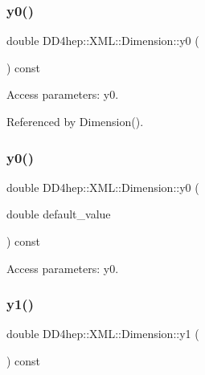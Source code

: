 \subsubsection{\texorpdfstring{y0()}{y0()}\hspace{0.1cm}{\footnotesize\ttfamily [1/2]}}
{\footnotesize\ttfamily double D\+D4hep\+::\+X\+M\+L\+::\+Dimension\+::y0 (\begin{DoxyParamCaption}{ }\end{DoxyParamCaption}) const}



Access parameters\+: y0. 



Referenced by Dimension().

\hypertarget{struct_d_d4hep_1_1_x_m_l_1_1_dimension_af356f83ce219b272fbad1d349d65f0ea}{}\label{struct_d_d4hep_1_1_x_m_l_1_1_dimension_af356f83ce219b272fbad1d349d65f0ea} 
\subsubsection{\texorpdfstring{y0()}{y0()}\hspace{0.1cm}{\footnotesize\ttfamily [2/2]}}
{\footnotesize\ttfamily double D\+D4hep\+::\+X\+M\+L\+::\+Dimension\+::y0 (\begin{DoxyParamCaption}\item[{double}]{default\+\_\+value }\end{DoxyParamCaption}) const}



Access parameters\+: y0. 

\hypertarget{struct_d_d4hep_1_1_x_m_l_1_1_dimension_a59a29570af0574b18541f49f2819f465}{}\label{struct_d_d4hep_1_1_x_m_l_1_1_dimension_a59a29570af0574b18541f49f2819f465} 
\subsubsection{\texorpdfstring{y1()}{y1()}\hspace{0.1cm}{\footnotesize\ttfamily [1/2]}}
{\footnotesize\ttfamily double D\+D4hep\+::\+X\+M\+L\+::\+Dimension\+::y1 (\begin{DoxyParamCaption}{ }\end{DoxyParamCaption}) const}



